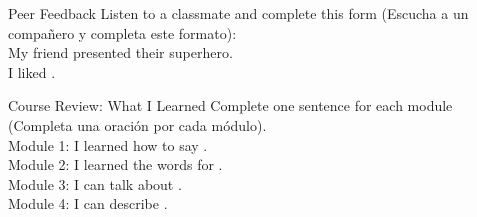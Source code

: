 \begin{activity}{Peer Feedback }
  Listen to a classmate and complete this form (Escucha a un compañero y completa este formato):\\
  
  My friend \answerline[4cm] presented their superhero.\\
  I liked \answerline[6cm].
\end{activity}

\begin{activity}{Course Review: What I Learned }
  Complete one sentence for each module (Completa una oración por cada módulo).\\
  
  Module 1: I learned how to say \answerline[5cm].\\
  Module 2: I learned the words for \answerline[5cm].\\
  Module 3: I can talk about \answerline[5cm].\\
  Module 4: I can describe \answerline[5cm].
\end{activity}

\vspace{2em}
\begin{center}
\end{center}

